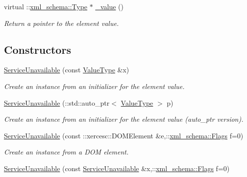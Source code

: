 \begin{DoxyCompactItemize}
virtual ::\hyperlink{namespacexml__schema_ad34e8fd175bf4f9fece6c670b01aa239}{xml\_\-schema::Type} $\ast$ \hyperlink{classopenstack_1_1xml_1_1ServiceUnavailable_af3381029ea0aded36baa21eda3a32101}{\_\-value} ()
\begin{DoxyCompactList}\small\item\em Return a pointer to the element value. \item\end{DoxyCompactList}\end{DoxyCompactItemize}
\subsection*{Constructors}
\begin{DoxyCompactItemize}
\item 
\hyperlink{classopenstack_1_1xml_1_1ServiceUnavailable_ac4b1fa2d12757aa0fd36f060acbd06ef}{ServiceUnavailable} (const \hyperlink{classopenstack_1_1xml_1_1ServiceUnavailableAPIFault}{ValueType} \&x)
\begin{DoxyCompactList}\small\item\em Create an instance from an initializer for the element value. \item\end{DoxyCompactList}\item 
\hyperlink{classopenstack_1_1xml_1_1ServiceUnavailable_adec50d7e7031c3dc8f739880a1a2b965}{ServiceUnavailable} (::std::auto\_\-ptr$<$ \hyperlink{classopenstack_1_1xml_1_1ServiceUnavailableAPIFault}{ValueType} $>$ p)
\begin{DoxyCompactList}\small\item\em Create an instance from an initializer for the element value (auto\_\-ptr version). \item\end{DoxyCompactList}\item 
\hyperlink{classopenstack_1_1xml_1_1ServiceUnavailable_af64f464fa1132ae9197243aa31fe5539}{ServiceUnavailable} (const ::xercesc::DOMElement \&e,::\hyperlink{namespacexml__schema_affb4c227cbd9aa7453dd1dc5a1401943}{xml\_\-schema::Flags} f=0)
\begin{DoxyCompactList}\small\item\em Create an instance from a DOM element. \item\end{DoxyCompactList}\item 
\hyperlink{classopenstack_1_1xml_1_1ServiceUnavailable_ae0773bdc0713a4524bf14d845e8ccffe}{ServiceUnavailable} (const \hyperlink{classopenstack_1_1xml_1_1ServiceUnavailable}{ServiceUnavailable} \&x,::\hyperlink{namespacexml__schema_affb4c227cbd9aa7453dd1dc5a1401943}{xml\_\-schema::Flags} f=0)

\end{DoxyCompactItemize}
